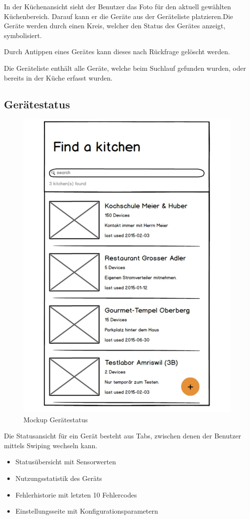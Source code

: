 In der Küchenansicht sieht der Benutzer das Foto für den aktuell gewählten Küchenbereich. Darauf kann er die Geräte aus der Geräteliste platzieren.Die Geräte werden durch einen Kreis, welcher den Status des Gerätes anzeigt, symbolisiert.

Durch Antippen eines Gerätes kann dieses nach Rückfrage gelöscht werden.

Die Geräteliste enthält alle Geräte, welche beim Suchlauf gefunden wurden, oder bereits in der Küche erfasst wurden.

\subsection{Gerätestatus}
\label{subsec:Gerätestatus}

\begin{figure}
	\includegraphics[page=5,trim=0 0 0 0,clip,scale=0.21]{uiux/res/mockups}
	\caption{Mockup Gerätestatus}
	\label{abb:mockDeviceDetail}
\end{figure}

Die Statusansicht für ein Gerät besteht aus Tabs, zwischen denen der Benutzer mittels Swiping wechseln kann.

\begin{itemize}
  \item Statusübersicht mit Sensorwerten
  \item Nutzungsstatistik des Geräts
  \item Fehlerhistorie mit letzten 10 Fehlercodes
  \item Einstellungsseite mit Konfigurationsparametern
\end{itemize}